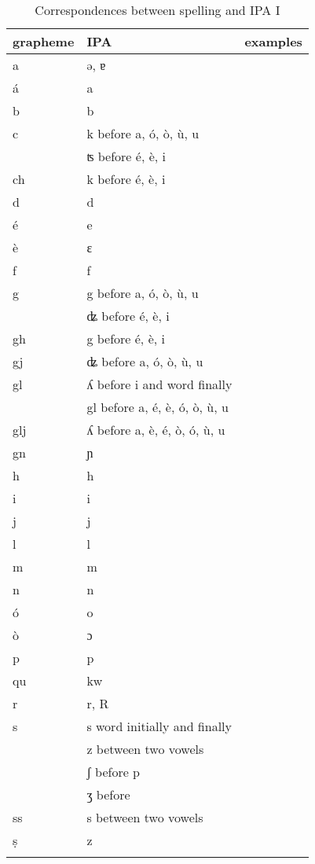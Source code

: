 \begin{table}
\caption{Correspondences between spelling and IPA I}
\label{graphIpaI} 
\begin{tabular}{lll}
    \lsptoprule
        grapheme      & IPA & examples\\
    \midrule  
  a & ə, ɐ\\
  á & a\\
  b & b\\
  c & k before a, ó, ò, ù, u\\
  & ʦ before é, è, i\\
  ch & k before é, è, i\\
  d & d\\
  é & e\\
  è & ɛ\\
  f & f\\
  g & g before a, ó, ò, ù, u\\
  & ʥ before é, è, i\\
  gh & g before é, è, i\\
  gj & ʥ before a, ó, ò, ù, u\\
  gl & ʎ before i and word finally\\
  & gl before a, é, è, ó, ò, ù, u\\
  glj & ʎ before a, è, é, ò, ó, ù, u\\
  gn& ɲ\\
  h & h\\
  i & i\\
  j & j\\
  l & l\\
  m & m\\
  n & n\\
  ó & o\\
  ò & ɔ\\
  p & p\\
  qu & kw\\
  r & r, R\\
  s & s word initially and finally\\
  & z between two vowels\\
  & ʃ before p\\
  & ʒ before \\
  ss & s between two vowels\\
  ṣ & z\\
  \lspbottomrule
\end{tabular} 
\end{table}


